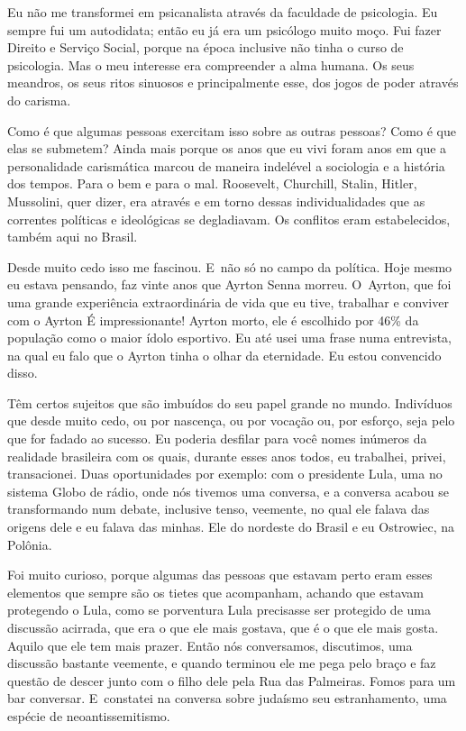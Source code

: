  

Eu não me transformei em psicanalista através da faculdade de
psicologia. Eu sempre fui um autodidata; então eu já era um psicólogo
muito moço. Fui fazer Direito e Serviço Social, porque na época
inclusive não tinha o curso de psicologia. Mas o meu interesse era
compreender a alma humana. Os seus meandros, os seus ritos sinuosos e
principalmente esse, dos jogos de poder através do carisma.

 

Como é que algumas pessoas exercitam isso sobre as outras pessoas? Como
é que elas se submetem? Ainda mais porque os anos que eu vivi foram
anos em que a personalidade carismática marcou de maneira indelével a
sociologia e a história dos tempos. Para o bem e para o mal. Roosevelt,
Churchill, Stalin, Hitler, Mussolini, quer dizer, era através e em torno
dessas individualidades que as correntes políticas e ideológicas se
degladiavam. Os conflitos eram estabelecidos, também aqui no Brasil.

 

Desde muito cedo isso me fascinou. E~não só no campo da política. Hoje
mesmo eu estava pensando, faz vinte anos que Ayrton Senna morreu. O~Ayrton, que foi uma grande experiência extraordinária de vida que eu
tive, trabalhar e conviver com o Ayrton É impressionante! Ayrton morto,
ele é escolhido por 46\% da população como o maior ídolo esportivo. Eu
até usei uma frase numa entrevista, na qual eu falo que o Ayrton tinha o
olhar da eternidade. Eu estou convencido disso.

 

Têm certos sujeitos que são imbuídos do seu papel grande no mundo.
Indivíduos que desde muito cedo, ou por nascença, ou por vocação ou, por
esforço, seja pelo que for fadado ao sucesso. Eu poderia desfilar para
você nomes inúmeros da realidade brasileira com os quais, durante esses
anos todos, eu trabalhei, privei, transacionei. Duas oportunidades por
exemplo: com o presidente Lula, uma no sistema Globo de rádio, onde nós
tivemos uma conversa, e a conversa acabou se transformando num debate,
inclusive tenso, veemente, no qual ele falava das origens dele e eu
falava das minhas. Ele do nordeste do Brasil e eu Ostrowiec, na Polônia.

 

Foi muito curioso, porque algumas das pessoas que estavam perto eram 
esses elementos que sempre são os tietes
que acompanham, achando que estavam protegendo o Lula, como se
porventura Lula precisasse ser protegido de uma discussão acirrada, que
era o que ele mais gostava, que é o que ele mais gosta. Aquilo que ele
tem mais prazer. Então nós conversamos, discutimos, uma discussão
bastante veemente, e quando terminou ele me pega pelo braço e faz
questão de descer junto com o filho dele pela Rua das Palmeiras. Fomos
para um bar conversar. E~constatei na conversa sobre judaísmo seu
estranhamento, uma espécie de neoantissemitismo. 

